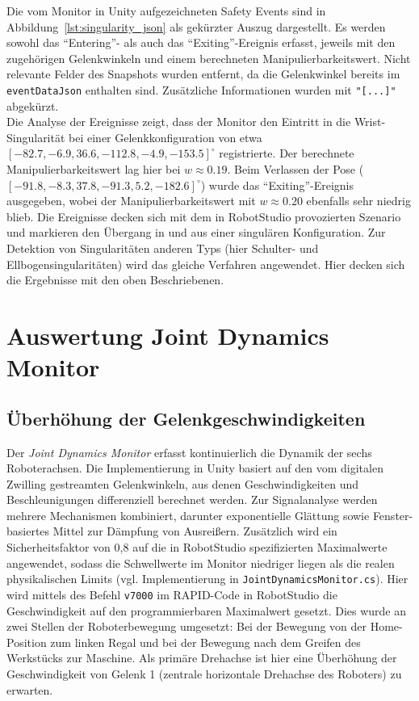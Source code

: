 \noindent
Die vom Monitor in Unity aufgezeichneten Safety Events sind in
Abbildung~\ref{lst:singularity_json} als gekürzter Auszug dargestellt. Es werden sowohl
das \enquote{Entering}- als auch das \enquote{Exiting}-Ereignis erfasst, jeweils mit den
zugehörigen Gelenkwinkeln und einem berechneten Manipulierbarkeitswert. Nicht relevante
Felder des Snapshots wurden entfernt, da die Gelenkwinkel bereits im \texttt{eventDataJson}
enthalten sind. Zusätzliche Informationen wurden mit \texttt{"[...]"}
abgekürzt.\\

\noindent
Die Analyse der Ereignisse zeigt, dass der Monitor den Eintritt in die Wrist-Singularität
bei einer Gelenkkonfiguration von etwa
$[-82.7, -6.9, 36.6, -112.8, -4.9, -153.5]^\circ$ registrierte. Der berechnete
Manipulierbarkeitswert lag hier bei $w \approx 0.19$. Beim Verlassen der Pose
($[-91.8, -8.3, 37.8, -91.3, 5.2, -182.6]^\circ$) wurde das \enquote{Exiting}-Ereignis
ausgegeben, wobei der Manipulierbarkeitswert mit $w \approx 0.20$ ebenfalls sehr niedrig blieb.
Die Ereignisse decken sich mit dem in RobotStudio provozierten Szenario und markieren den
Übergang in und aus einer singulären Konfiguration.
Zur Detektion von Singularitäten anderen Typs (hier Schulter- und
Ellbogensingularitäten) wird das gleiche Verfahren angewendet. Hier decken sich
die Ergebnisse mit den oben Beschriebenen.

\section{Auswertung Joint Dynamics Monitor}
\label{sec:Analyse_Sicherheit}

\subsection{Überhöhung der Gelenkgeschwindigkeiten}

Der \textit{Joint Dynamics Monitor} erfasst kontinuierlich die Dynamik der sechs
Roboterachsen. Die Implementierung in Unity basiert auf den vom digitalen
Zwilling gestreamten Gelenkwinkeln, aus denen Geschwindigkeiten und
Beschleunigungen differenziell berechnet werden. Zur Signalanalyse werden
mehrere Mechanismen kombiniert, darunter exponentielle Glättung sowie
Fenster-basiertes Mittel zur Dämpfung von Ausreißern. Zusätzlich wird ein
Sicherheitsfaktor von 0{,}8 auf die in RobotStudio spezifizierten Maximalwerte
angewendet, sodass die Schwellwerte im Monitor niedriger liegen als die realen
physikalischen Limits (vgl. Implementierung in
\texttt{JointDynamicsMonitor.cs}). Hier wird mittels des Befehl \texttt{v7000}
im RAPID-Code in RobotStudio die Geschwindigkeit auf den programmierbaren
Maximalwert gesetzt. Dies wurde an zwei Stellen der Roboterbewegung umgesetzt:
Bei der Bewegung von der Home-Position zum linken Regal und bei der Bewegung
nach dem Greifen des Werkstücks zur Maschine. Als primäre Drehachse ist hier
eine Überhöhung der Geschwindigkeit von Gelenk 1 (zentrale horizontale Drehachse
des Roboters) zu erwarten.

